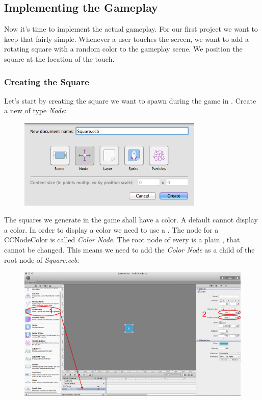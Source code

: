 \subsection{Implementing the Gameplay}
Now it's time to implement the actual gameplay. For our first project we want to
keep that fairly simple. Whenever a user touches the screen, we want to add a
rotating square with a random color to the gameplay scene. We position the
square at the location of the touch. 

\subsubsection{Creating the Square \ccbfile{}}

Let's start by creating the square we want
to spawn during the game in \SB{}. Create a new \ccbfile{} of type
\textit{Node}: 
\begin{figure}[H]
		\centering
		\includegraphics[width=250pt]{images/firstproject/square_ccb.png}
\end{figure}
The squares we generate in the game shall have a color. A default \ccnode{}
cannot display a color. In order to display a color we need to use a
. The \SB{} node for a CCNodeColor is called
\textit{Color Node}. The root node of every \ccbfile{} is a plain \ccnode{},
that cannot be changed. This means we need to add the \textit{Color Node} as a
child of the root node of \textit{Square.ccb}:
\begin{figure}[H]
		\centering
		\includegraphics[width=0.9\linewidth]{images/firstproject/square_add_colornode.png}
\end{figure}
